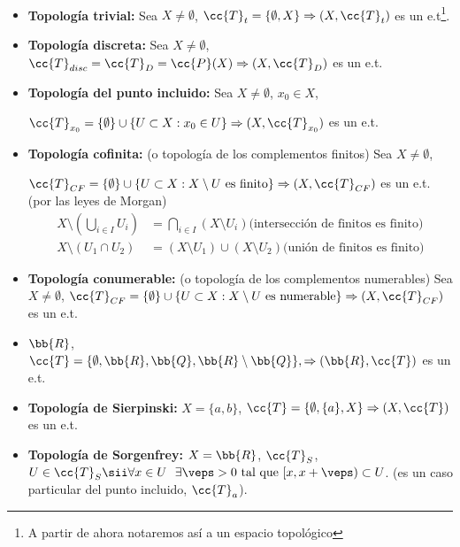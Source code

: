 \begin{ejemplo}\ 
    \begin{itemize}
        \item \textbf{Topología trivial:} Sea $X \neq \emptyset$, $\cc{T}_t = \{\emptyset, X\} \Rightarrow (X, \cc{T}_t)$ es un e.t\footnote{A partir de ahora notaremos así a un espacio topológico}.
        \item \textbf{Topología discreta:} Sea $X \neq \emptyset$, $\cc{T}_{disc}= \cc{T}_{D} = \cc{P}(X) \Rightarrow (X, \cc{T}_D)$ es un e.t.
        \item \textbf{Topología del punto incluido:} Sea $X \neq \emptyset$, $x_0\in X$,
        
        $\cc{T}_{x_0} = \{\emptyset\}\cup \{U \subset X : x_0 \in U\} \Rightarrow (X, \cc{T}_{x_0})$ es un e.t.
        \item \textbf{Topología cofinita:} (o topología de los complementos finitos) Sea $X \neq \emptyset$,
        
        $\cc{T}_{CF} = \{\emptyset\}\cup\{U\subset X : X \setminus U \text{ es finito}\} \Rightarrow (X, \cc{T}_{CF})$ es un e.t. (por las leyes de Morgan)
        \begin{align*}
            X \setminus \left(\bigcup\limits_{i\in I}U_i\right) &= \bigcap\limits_{i\in I}(X \setminus U_i) \text{(intersección de finitos es finito)}\\
            X \setminus (U_1 \cap U_2) &= (X\setminus U_1) \cup (X \setminus U_2)\text{(unión de finitos es finito)}
        \end{align*}
        \item \textbf{Topología conumerable:} (o topología de los complementos numerables) Sea $X \neq \emptyset$, $\cc{T}_{CF} = \{\emptyset\}\cup\{U\subset X : X \setminus U \text{ es numerable}\} \Rightarrow (X, \cc{T}_{CF})$ es un e.t.
        \item $\bb{R}$, $ \cc{T}=\{\emptyset, \bb{R}, \bb{Q}, \bb{R}\setminus \bb{Q}\}, \Rightarrow (\bb{R}, \cc{T})$ es un e.t. 
        \item \textbf{Topología de Sierpinski:} $X=\{a,b\}$, $\cc{T}=\{\emptyset, \{a\}, X\} \Rightarrow (X, \cc{T})$ es un e.t.
        \item \textbf{Topología de Sorgenfrey:} $X=\bb{R}$, $\cc{T}_S$, $U\in \cc{T}_S \sii \forall x \in U \ \  \exists \veps > 0 \text{ tal que } [x, x+\veps) \subset U$. (es un caso particular del punto incluido, $\cc{T}_a$).
    \end{itemize}
    \endsquare
\end{ejemplo}

